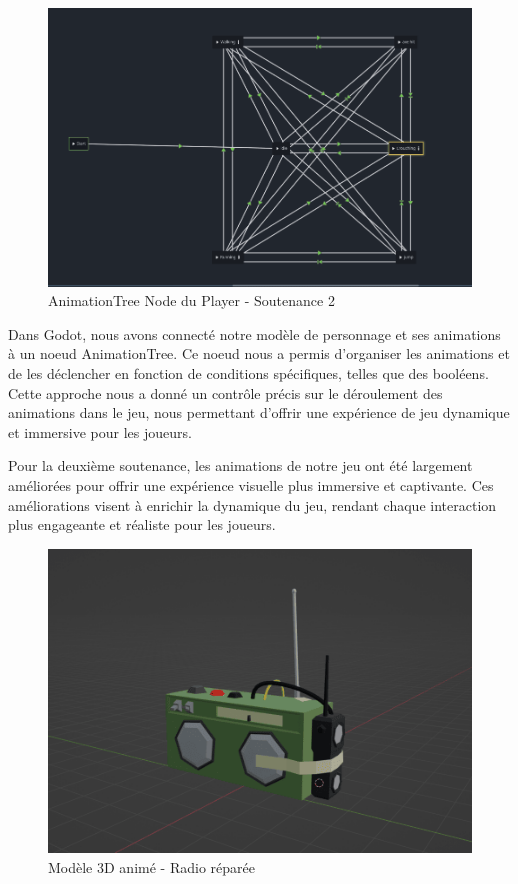\documentclass[
	article,			%
	11pt,				%
	oneside,			%
	a4paper,			%
	chapter=TITLE,
	french,			%
	sumario=tradicional
	]{base_nt}
\begin{document}
\begin{figure}[ht]
	\caption{AnimationTree Node du Player - Soutenance 2}
	\centering
	\includegraphics[width=1\linewidth]{paper22.png}
	\legend{}
	
\end{figure}

\newpage

Dans Godot, nous avons connecté notre modèle de personnage et ses animations à un noeud AnimationTree. Ce noeud nous a permis d'organiser les animations et de les déclencher en fonction de conditions spécifiques, telles que des booléens. Cette approche nous a donné un contrôle précis sur le déroulement des animations dans le jeu, nous permettant d'offrir une expérience de jeu dynamique et immersive pour les joueurs.

\newpage

Pour la deuxième soutenance, les animations de notre jeu ont été largement améliorées pour offrir une expérience visuelle plus immersive et captivante. Ces améliorations visent à enrichir la dynamique du jeu, rendant chaque interaction plus engageante et réaliste pour les joueurs.

\begin{figure}[ht]
	\caption{Modèle 3D animé - Radio réparée}
	\centering
	\includegraphics[width=1\linewidth]{paper15.png}
	\legend{}
	
\end{figure}
\end{document}
